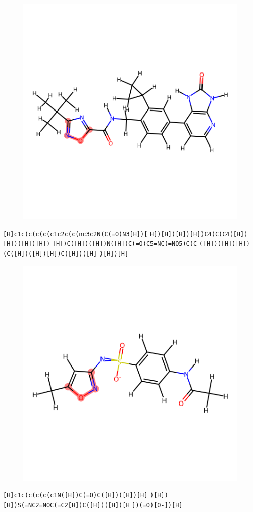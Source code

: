 \documentclass{article}
\begin{document}
\begin{figure}[ht]
\centering
    \includegraphics{mol282.png}
\end{figure}
\verb|[H]c1c(c(c(c(c1c2c(c(nc3c2N(C(=O)N3[H])[| \verb|H])[H])[H])[H])C4(C(C4([H])[H])([H])[H])| \verb|[H])C([H])([H])N([H])C(=O)C5=NC(=NO5)C(C| \verb|([H])([H])[H])(C([H])([H])[H])C([H])([H]| \verb|)[H])[H]|

\begin{figure}[ht]
\centering
    \includegraphics{mol283.png}
\end{figure}
\verb|[H]c1c(c(c(c(c1N([H])C(=O)C([H])([H])[H]| \verb|)[H])[H])S(=NC2=NOC(=C2[H])C([H])([H])[H| \verb|])(=O)[O-])[H]|
\end{document}
